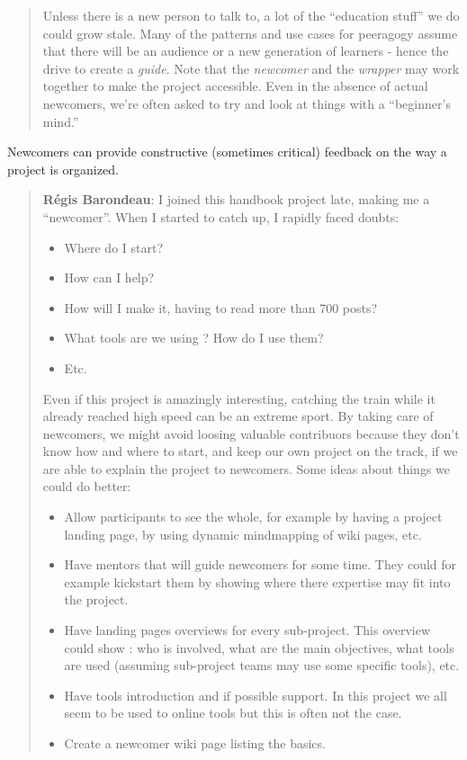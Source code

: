\begin{quote}
Unless there is a new person to talk to, a lot of the ``education
stuff'' we do could grow stale. Many of the patterns and use cases for
peeragogy assume that there will be an audience or a new generation of
learners - hence the drive to create a \emph{guide}. Note that the
\emph{newcomer} and the \emph{wrapper} may work together to make the
project accessible. Even in the absence of actual newcomers, we're often
asked to try and look at things with a ``beginner's mind.''
\end{quote}

Newcomers can provide constructive (sometimes critical) feedback on
the way a project is organized.

\begin{quote}
\textbf{R\'egis Barondeau}: I joined this handbook project late, making
me a ``newcomer''. When I started to catch up, I rapidly faced doubts:

\begin{itemize}
\item Where do I start?
\item How can I help?
\item How will I make it, having to read more than 700 posts?
\item What tools are we using ? How do I use them?
\item Etc.
\end{itemize}

Even if this project is amazingly interesting, catching the train
while it already reached high speed can be an extreme sport.  By
taking care of newcomers, we might avoid loosing valuable contribuors
because they don't know how and where to start, and keep our own
project on the track, if we are able to explain the project to
newcomers. Some ideas about things we could do better:

\begin{itemize}
\item Allow participants to see the whole, for example by having a
  project landing page, by using dynamic mindmapping of wiki pages,
  etc.

\item Have mentors that will guide newcomers for some time. They could
  for example kickstart them by showing where there expertise may fit
  into the project.

\item Have landing pages overviews for every sub-project. This
  overview could show : who is involved, what are the main objectives,
  what tools are used (assuming sub-project teams may use some
  specific tools), etc.

\item Have tools introduction and if possible support. In this project
  we all seem to be used to online tools but this is often not the
  case.

\item Create a newcomer wiki page listing the basics.
\end{itemize}
\end{quote}

